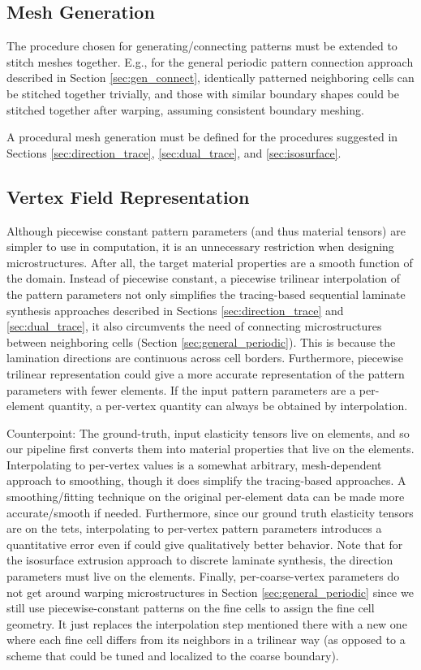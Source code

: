 \documentclass[10pt]{article}
\begin{document}
\subsection{Mesh Generation}
The procedure chosen for generating/connecting patterns must be
extended to stitch meshes together. E.g., for the general periodic pattern
connection approach described in Section \ref{sec:gen_connect}, identically
patterned neighboring cells can be stitched together trivially, and those with
similar boundary shapes could be stitched together after warping, assuming
consistent boundary meshing.

A procedural mesh generation must be defined for the procedures suggested
in Sections \ref{sec:direction_trace}, \ref{sec:dual_trace}, and
\ref{sec:isosurface}.

\subsection{Vertex Field Representation}
Although piecewise constant pattern parameters (and thus material tensors) are
simpler to use in computation, it is an unnecessary restriction when designing
microstructures.  After all, the target material properties are a smooth function
of the domain. Instead of piecewise constant, a piecewise trilinear
interpolation of the pattern parameters not only simplifies the tracing-based
sequential laminate synthesis approaches described in Sections
\ref{sec:direction_trace} and \ref{sec:dual_trace}, it also circumvents the need
of connecting microstructures between neighboring cells (Section
\ref{sec:general_periodic}).  This is because the lamination directions are
continuous across cell borders.  Furthermore, piecewise trilinear representation
could give a more accurate representation of the pattern parameters with fewer
elements. If the input pattern parameters are a per-element quantity, a
per-vertex quantity can always be obtained by interpolation.

Counterpoint:
The ground-truth, input elasticity tensors live on elements, and so our pipeline
first converts them into material properties that live on the elements.
Interpolating to per-vertex values is a somewhat arbitrary, mesh-dependent
approach to smoothing, though it does simplify the tracing-based approaches. A
smoothing/fitting technique on the original per-element data can be made more
accurate/smooth if needed. Furthermore, since our ground truth elasticity
tensors are on the tets, interpolating to per-vertex pattern parameters
introduces a quantitative error even if could give qualitatively better
behavior. Note that for the isosurface extrusion approach to discrete laminate
synthesis, the direction parameters must live on the elements. Finally,
per-coarse-vertex parameters do not get around warping microstructures
in Section \ref{sec:general_periodic} since we still use piecewise-constant
patterns on the fine cells to assign the fine cell geometry. It just replaces
the interpolation step mentioned there with a new one where each fine cell
differs from its neighbors in a trilinear way (as opposed to a scheme that
could be tuned and localized to the coarse boundary).
\end{document}
